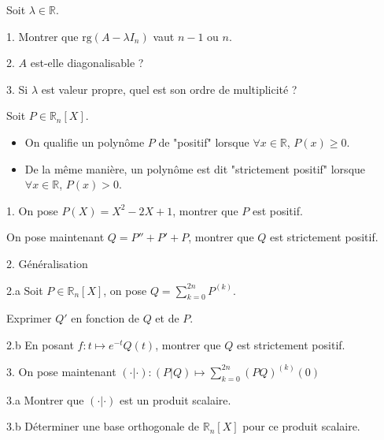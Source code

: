 \noindent Soit $\lambda \in \mathbb{R}$.

\vspace{5pt}
1. Montrer que $\mathrm{rg}(A-\lambda I_n)$ vaut $n-1$ ou $n$.

\vspace{5pt}
2. $A$ est-elle diagonalisable ?

\vspace{5pt}
3. Si $\lambda$ est valeur propre, quel est son ordre de multiplicité ?




\subetoiles
\columnbreak




\noindent Soit $P \in \mathbb{R}_n[X]$.
\begin{itemize}
  \item On qualifie un polynôme $P$ de "positif" lorsque $\forall x \in \mathbb{R}$, $P(x) \geqslant 0$.
  \item De la même manière, un polynôme est dit "strictement positif" lorsque $\forall x \in \mathbb{R}$, $P(x) > 0$.
\end{itemize}

\vspace{5pt}
1. On pose $P(X) = X^2 - 2X + 1$, montrer que $P$ est positif.

On pose maintenant $Q = P'' + P' + P$, montrer que $Q$ est strictement positif.

\vspace{5pt}
2. Généralisation

\vspace{5pt}
\;\;\; 2.a Soit $P \in \mathbb{R}_n[X]$, on pose $\displaystyle Q = \sum_{k=0}^{2n}P^{(k)}$.

\;\;\; Exprimer $Q'$ en fonction de $Q$ et de $P$.

\vspace{10pt}
\;\;\; 2.b En posant $\displaystyle f : t \mapsto e^{-t}Q(t)$, montrer que $Q$ est strictement positif.

\vspace{10pt}
3. On pose maintenant $\displaystyle (\cdot | \cdot) : (P|Q) \mapsto \sum_{k=0}^{2n}(PQ)^{(k)}(0)$

\vspace{5pt}
\;\;\; 3.a Montrer que $(\cdot | \cdot)$ est un produit scalaire.

\vspace{5pt}
\;\;\; 3.b Déterminer une base orthogonale de $\mathbb{R}_n[X]$ pour ce produit scalaire.

